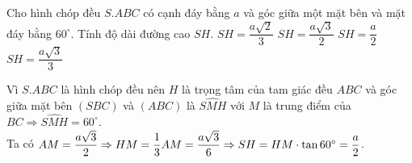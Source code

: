 \begin{ex}%
Cho hình chóp đều $S.ABC$ có cạnh đáy bằng $a$ và góc giữa một mặt bên và mặt đáy bằng $60^\circ$. Tính độ dài đường cao $SH$.
\choice
{$SH=\dfrac{a\sqrt{2}}{3}$}
{$SH=\dfrac{a\sqrt{3}}{2}$}
{\True $SH=\dfrac{a}{2}$}
{$SH=\dfrac{a\sqrt{3}}{3}$}
\loigiai
{
\immini
{Vì $S.ABC$ là hình chóp đều nên $H$ là trọng tâm của tam giác đều $ABC$ và góc giữa mặt bên $(SBC)$ và $(ABC)$ là $\widehat{SMH}$ với $M$ là trung điểm
của $BC\Rightarrow \widehat{SMH}=60^\circ$.\\
Ta có $AM=\dfrac{a\sqrt{3}}{2}\Rightarrow HM=\dfrac{1}{3}AM=\dfrac{a\sqrt{3}}{6}\\
\Rightarrow SH=HM\cdot \tan 60^\circ=\dfrac{a}{2}$.
}
{
}	
}
\end{ex}


